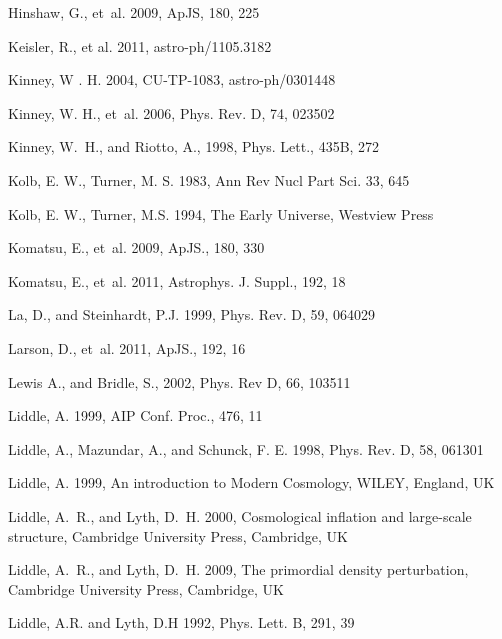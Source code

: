 \documentclass{rmaa}
\begin{document}
\begin{thebibliography}
Hinshaw, G., et~al. 2009, ApJS, 180, 225

  Keisler, R., et al. 2011, astro-ph/1105.3182  
 
  Kinney, W . H. 2004, CU-TP-1083, astro-ph/0301448
 
 Kinney, W. H.,  et~al. 2006, Phys. Rev. D, 74, 023502

 Kinney, W.~H., and {Riotto}, A.,  1998, Phys. Lett., 435B, 272

Kolb, E. W., Turner, M. S. 1983, Ann Rev Nucl Part Sci. 33, 645
  
Kolb, E. W., Turner, M.S. 1994, The Early Universe, Westview Press  

  Komatsu, E., et~al. 2009, ApJS., 180, 330 
  
Komatsu, E., et~al. 2011, Astrophys. J. Suppl., 192, 18

  La, D., and {Steinhardt}, P.J.  1999, Phys. Rev. D, 59, 064029
 
Larson, D., et~al. 2011, ApJS., 192, 16

Lewis A., and Bridle, S., 2002, Phys. Rev D, 66, 103511 
   
  Liddle, A. 1999, AIP Conf. Proc., 476, 11

 Liddle, A.,  {Mazundar,} A., and {Schunck,} F. E. 1998, Phys. Rev. D, 58, 061301  

Liddle, A. 1999, An introduction to Modern Cosmology, WILEY, England, UK

 Liddle, A.~R., and  Lyth, D.~H. 2000, Cosmological inflation and large-scale structure,
  Cambridge University Press, Cambridge, UK 

 Liddle, A.~R., and  Lyth, D.~H. 2009, The primordial density perturbation,
  Cambridge University Press, Cambridge, UK 
  
 Liddle, A.R. and Lyth, D.H 1992, Phys. Lett. B, 291, 39


\end{thebibliography}
\end{document}

